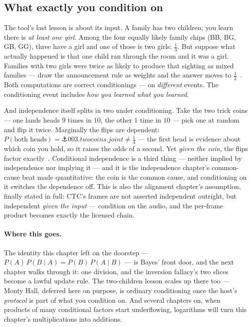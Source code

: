 \begin{narrative}
\section{What exactly you condition on}

The tool's last lesson is about its input. A family has two children;
you learn there is \emph{at least one girl}. Among the four equally
likely family chips (BB, BG, GB, GG), three have a girl and one of
those is two girls: $\tfrac13$. But suppose what actually happened is
that one child ran through the room and it was a girl. Families with
two girls were twice as likely to produce that sighting as mixed
families — draw the announcement rule as weights and the answer moves
to $\tfrac12$~\cite{probability-wikipedia-boy-or-girl-paradox}. Both
computations are correct conditionings — on \emph{different} events.
The conditioning event includes \emph{how you learned what you
learned}.

And independence itself splits in two under conditioning. Take the two
trick coins — one lands heads $9$ times in $10$, the other $1$ time in
$10$ — pick one at random and flip it twice. Marginally the flips are
dependent: $P(\text{both heads}) = \anchor{003.twocoins.joint} \neq
\tfrac14$ — the first head is evidence about which coin you hold, so it
raises the odds of a second. Yet \emph{given the coin}, the flips
factor exactly~\cite{probability-wikipedia-conditional-independence}.
Conditional independence is a third thing — neither implied by
independence nor implying it — and it is the independence chapter's
common-cause beat made quantitative: the coin is the common cause, and
conditioning on it switches the dependence off. This is also the
alignment chapter's assumption, finally stated in full: CTC's frames
are not asserted independent outright, but independent \emph{given the
input} — condition on the audio, and the per-frame product becomes
exactly the licensed chain.

\paragraph{Where this goes.} The identity this chapter left on the
doorstep — $P(A)\,P(B \mid A) = P(B)\,P(A \mid B)$ — is Bayes' front
door, and the next chapter walks through it: one division, and the
inversion fallacy's two slices become a lawful update rule. The
two-children lesson scales up there too — Monty Hall, deferred here on
purpose, is ordinary conditioning once the host's \emph{protocol} is
part of what you condition on. And several chapters on, when products
of many conditional factors start underflowing, logarithms will turn
this chapter's multiplications into additions.
\end{narrative}

